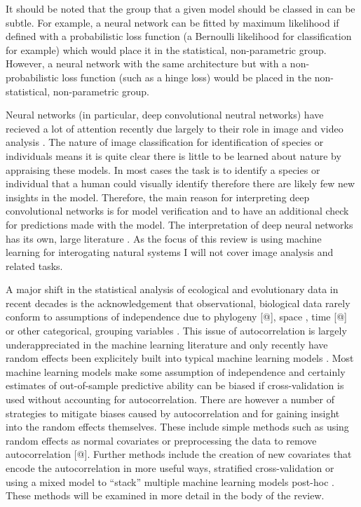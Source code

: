 \documentclass[10pt,]{article}
\begin{document}
It should be noted that the group that a given model should be classed in can be subtle. For example, a neural network can be fitted by maximum likelihood if defined with a probabilistic loss function (a Bernoulli likelihood for classification for example) which would place it in the statistical, non-parametric group. However, a neural network with the same architecture but with a non-probabilistic loss function (such as a hinge loss) would be placed in the non-statistical, non-parametric group.

Neural networks (in particular, deep convolutional neutral networks) have recieved a lot of attention recently due largely to their role in image and video analysis \citep{waldchen2018machine}. The nature of image classification for identification of species or individuals means it is quite clear there is little to be learned about nature by appraising these models. In most cases the task is to identify a species or individual that a human could visually identify \citep{waldchen2018machine, mac2018bat} therefore there are likely few new insights in the model. Therefore, the main reason for interpreting deep convolutional networks is for model verification and to have an additional check for predictions made with the model. The interpretation of deep neural networks has its own, large literature \citep{samek2017explainable, montavon2017methods}. As the focus of this review is using machine learning for interogating natural systems I will not cover image analysis and related tasks.

A major shift in the statistical analysis of ecological and evolutionary data in recent decades is the acknowledgement that observational, biological data rarely conform to assumptions of independence due to phylogeny {[}@{]}, space \citep[\citet{redding2017evaluating}]{diggle1998model}, time {[}@{]} or other categorical, grouping variables \citep[\citet{harrison2018brief}]{bolker2009generalized}. This issue of autocorrelation is largely underappreciated in the machine learning literature and only recently have random effects been explicitely built into typical machine learning models \citep{eo2014tree, hajjem2014mixed, hajjem2017generalized, miller2017gradient}. Most machine learning models make some assumption of independence and certainly estimates of out-of-sample predictive ability can be biased if cross-validation is used without accounting for autocorrelation. There are however a number of strategies to mitigate biases caused by autocorrelation and for gaining insight into the random effects themselves. These include simple methods such as using random effects as normal covariates or preprocessing the data to remove autocorrelation {[}@{]}. Further methods include the creation of new covariates that encode the autocorrelation in more useful ways, stratified cross-validation \citep{le2014spatial} or using a mixed model to ``stack'' multiple machine learning models post-hoc \citep{bhatt2017improved}. These methods will be examined in more detail in the body of the review.
\end{document}
